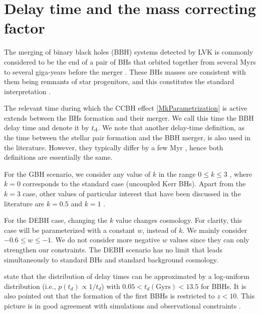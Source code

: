 \documentclass[fleqn,usenatbib,useAMS]{mnras}
\begin{document}
\section{Delay time and the mass correcting factor} \label{sec:td}

The merging of binary black holes (BBH) systems detected by LVK is commonly considered to be the end of a pair of BHs that orbited together from several Myrs to several giga-years before the merger \citep{KAGRA:2021kbb}. 
These BHs masses are  consistent with them being remnants of star progenitors, and this constitutes the standard interpretation \citep[e.g.,][]{Belczynski:2016obo, Mapelli:2020vfa, vanSon:2021zpk, Chen:2022gaf, KAGRA:2021duu}. 


The relevant time during which the CCBH effect \eqref{MkParametrization} is active extends between the BHs formation and their merger. We call this time the BBH delay time and denote it by $t_{\rm d}$. We note that another delay-time definition, as the time between the stellar pair formation and the BBH merger, is also used in the literature. However, they typically differ by a few Myr \citep{vanSon:2021zpk}, hence both definitions are essentially the same. 

For the GBH scenario, we consider any value of $k$ in the range $0\leq k \leq 3$ \citep{Croker:2021duf}, where $k=0$ corresponds to the standard case (uncoupled Kerr BHs).  Apart from the $k=3$ case, other values of particular interest that have been discussed in the literature  are $k=0.5$ \citep{Croker:2021duf} and $k=1$ \citep{Cadoni:2023lum}.


For the DEBH case, changing the $k$ value changes cosmology. For clarity, this case will be  parameterized with a constant $w$, instead of $k$. We mainly consider $ -0.6 \leq w \leq -1$. We do not consider more negative $w$ values since they can only strengthen our constraints. 
The DEBH scenario has no limit that leads simultaneously to standard BHs and standard background cosmology. 

\citet{KAGRA:2021kbb, KAGRA:2021duu} state that the distribution of delay times can be approximated by a log-uniform distribution (i.e., $p(t_d) \propto 1/t_d$) with $0.05 < t_d (\mbox{Gyrs}) < 13.5 $ for BBHs. It is also pointed out that the formation of the first BBHs is restricted to $z < 10$. This picture is in good agreement with simulations and observational constraints \citep[e.g.,][]{Belczynski:2016obo, vanSon:2021zpk, Fishbach:2021mhp}.  
\end{document}
